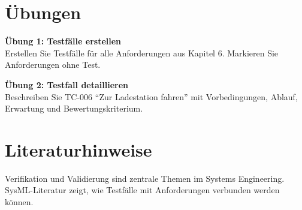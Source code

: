 \section{Übungen}
\begin{uebungbox}
\textbf{Übung 1: Testfälle erstellen}\\
Erstellen Sie Testfälle für alle Anforderungen aus Kapitel 6. Markieren Sie Anforderungen ohne Test.
\end{uebungbox}

\begin{uebungbox}
\textbf{Übung 2: Testfall detaillieren}\\
Beschreiben Sie TC-006 \enquote{Zur Ladestation fahren} mit Vorbedingungen, Ablauf, Erwartung und Bewertungskriterium.
\end{uebungbox}

\section{Literaturhinweise}
Verifikation und Validierung sind zentrale Themen im Systems Engineering. SysML-Literatur \cite{friedenthal2014} zeigt, wie Testfälle mit Anforderungen verbunden werden können.
